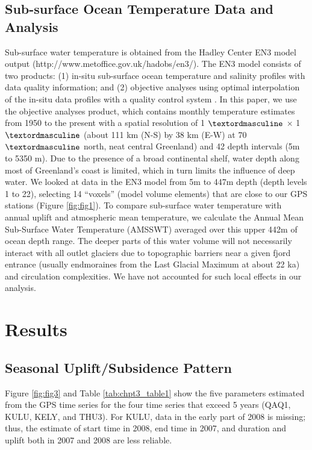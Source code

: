 \subsection{Sub-surface Ocean Temperature Data and Analysis}
Sub-surface water temperature is obtained from the Hadley Center EN3 model output (http://www.metoffice.gov.uk/hadobs/en3/). The EN3 model consists of two products: (1) in-situ sub-surface ocean temperature and salinity profiles with data quality information; and (2) objective analyses using optimal interpolation of the in-situ data profiles with a quality control system \cite[]{ingleby2007quality}. In this paper, we use the objective analyses product, which contains monthly temperature estimates from 1950 to the present with a spatial resolution of 1 $\textordmasculine$ $\times$ 1 $\textordmasculine$ (about 111 km (N-S) by 38 km (E-W) at 70 $\textordmasculine$ north, neat central Greenland) and 42 depth intervals (5m to 5350 m). Due to the presence of a broad continental shelf, water depth along most of Greenland’s coast is limited, which in turn limits the influence of deep water. We looked at data in the EN3 model from 5m to 447m depth (depth levels 1 to 22), selecting 14 “voxels” (model volume elements) that are close to our GPS stations (Figure \ref{fig:fig1}). To compare sub-surface water temperature with annual uplift and atmospheric mean temperature, we calculate the Annual Mean Sub-Surface Water Temperature (AMSSWT) averaged over this upper 442m of ocean depth range. The deeper parts of this water volume will not necessarily interact with all outlet glaciers due to topographic barriers near a given fjord entrance (usually endmoraines from the Last Glacial Maximum at about 22 ka) and circulation complexities. We have not accounted for such local effects in our analysis.

\section{Results}
\subsection{Seasonal Uplift/Subsidence Pattern}
Figure \ref{fig:fig3} and Table \ref{tab:chpt3_table1} show the five parameters
estimated from the GPS time series for the four
time series that exceed 5 years (QAQ1, KULU,
KELY, and THU3). For KULU, data in the early
part of 2008 is missing; thus, the estimate of start
time in 2008, end time in 2007, and duration and
uplift both in 2007 and 2008 are less reliable.

